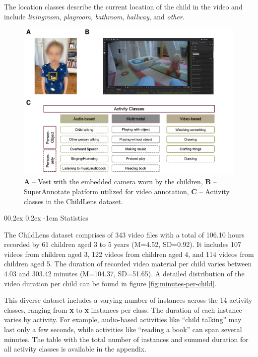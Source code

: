 \documentclass[
  man,floatsintext]{apa6}
\makeatletter
\let\oldparagraph\paragraph
\renewcommand{\paragraph}{
    \@ifstar
      \xxxParagraphStar
      \xxxParagraphNoStar
  }
\newcommand{\xxxParagraphStar}[1]{\oldparagraph*{#1}\mbox{}}
\newcommand{\xxxParagraphNoStar}[1]{\oldparagraph{#1}\mbox{}}
\renewcommand{\paragraph}{\@startsection{paragraph}{4}{\parindent}%
  {0\baselineskip \@plus 0.2ex \@minus 0.2ex}%
  {-1em}%
  {\normalfont\normalsize\bfseries\itshape\typesectitle}}
\makeatother
\begin{document}
The location classes describe the current location of the child in the video and include \emph{livingroom}, \emph{playroom}, \emph{bathroom}, \emph{hallway}, and \emph{other}.

\begin{figure}

{\centering \includegraphics{ChildLens_paper_files/figure-latex/camera-superannotate-activity-classes-1} 

}

\caption{\textbf{A} – Vest with the embedded camera worn by the children, \textbf{B} – SuperAnnotate platform utilized for video annotation, \textbf{C} – Activity classes in the ChildLens dataset.}\label{fig:camera-superannotate-activity-classes}
\end{figure}

\paragraph{Statistics}\label{statistics}

The ChildLens dataset comprises of 343 video files with a total of 106.10 hours recorded by 61 children aged 3 to 5 years (M=4.52, SD=0.92). It includes 107 videos from children aged 3, 122 videos from children aged 4, and 114 videos from children aged 5. The duration of recorded video material per child varies between 4.03 and 303.42 minutes (M=104.37, SD=51.65). A detailed distribution of the video duration per child can be found in figure \ref{fig:minutes-per-child}.

This diverse dataset includes a varying number of instances across the 14 activity classes, ranging from \textbf{x} to \textbf{x} instances per class. The duration of each instance varies by activity. For example, audio-based activities like ``child talking'' may last only a few seconds, while activities like ``reading a book'' can span several minutes. The table with the total number of instances and summed duration for all activity classes is available in the appendix.
\end{document}

